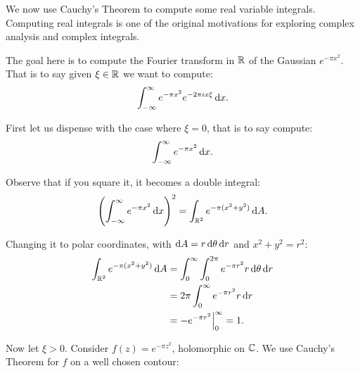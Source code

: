 We now use Cauchy's Theorem to compute some real variable integrals. Computing real integrals is one of the original motivations for exploring complex analysis and complex integrals.

\begin{example}

The goal here is to compute the Fourier transform in $\mathbb{R}$ of the Gaussian $e^{- \pi x^2}$.  That is to say given $\xi \in \mathbb{R}$ we want to compute:
\begin{align*}
    \int_{-\infty}^{\infty} e^{- \pi x^2} e^{- 2 \pi i x \xi} \dif x.
\end{align*}

First let us dispense with the case where $\xi = 0$, that is to say compute:
\begin{align*}
    \int_{-\infty}^{\infty} e^{- \pi x^2} \dif x.
\end{align*}

Observe that if you square it, it becomes a double integral:
\begin{align*}
    \left(  \int_{-\infty}^{\infty} e^{- \pi x^2}  \dif x \right)^2 = \int_{\R ^2}  e^{- \pi( x^2+y^2)}  \dif A.
\end{align*}

Changing it to polar coordinates, with $\dif A = r \dif \theta \dif r $ and $x^2+y^2 = r^2$:
\begin{align*}
    \int_{\R ^2}  e^{- \pi( x^2+y^2)}  \dif A &= \int_{0}^{\infty} \int_{0}^{2 \pi} e^{- \pi r^2}  r \dif \theta \dif r \\
    &= 2 \pi \int_{0}^{\infty}  e^{- \pi r^2}  r \dif r \\
    &= -e^{-\pi r^2} \Bigr|_0^\infty = 1.
\end{align*}

Now let $\xi > 0$. Consider $f(z) =  e^{- \pi z^2}$, holomorphic on $\mathbb{C}$. We use Cauchy's Theorem for $f$ on a well chosen contour:

\begin{center}
\end{center}
\end{example}
